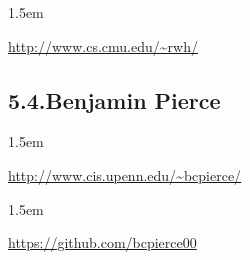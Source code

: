 \documentclass[12pt,twoside]{article}
\begin{document}
\begin{mddefinitions}%


\begin{mdbmarginx}{}{}{}{1.5em}%
\begin{mddefdata}%
\href{http://www.cs.cmu.edu/~rwh/}{{\ttfamily http://\hspace{0pt}www.\hspace{0pt}cs.\hspace{0pt}cmu.\hspace{0pt}edu/\hspace{0pt}\textasciitilde{}rwh/\hspace{0pt}}}%
\end{mddefdata}%
\end{mdbmarginx}%
\end{mddefinitions}%

\subsection{5.4.\hspace*{0.5em}Benjamin Pierce}%

\begin{mddefinitions}%


\begin{mdbmarginx}{}{}{}{1.5em}%
\begin{mddefdata}%
\href{http://www.cis.upenn.edu/~bcpierce/}{{\ttfamily http://\hspace{0pt}www.\hspace{0pt}cis.\hspace{0pt}upenn.\hspace{0pt}edu/\hspace{0pt}\textasciitilde{}bcpierce/\hspace{0pt}}}
\end{mddefdata}%
\end{mdbmarginx}%


\begin{mdbmarginx}{}{}{}{1.5em}%
\begin{mddefdata}%
\href{https://github.com/bcpierce00}{{\ttfamily https://\hspace{0pt}github.\hspace{0pt}com/\hspace{0pt}bcpierce00}}%
\end{mddefdata}%
\end{mdbmarginx}%
\end{mddefinitions}%
\end{document}

